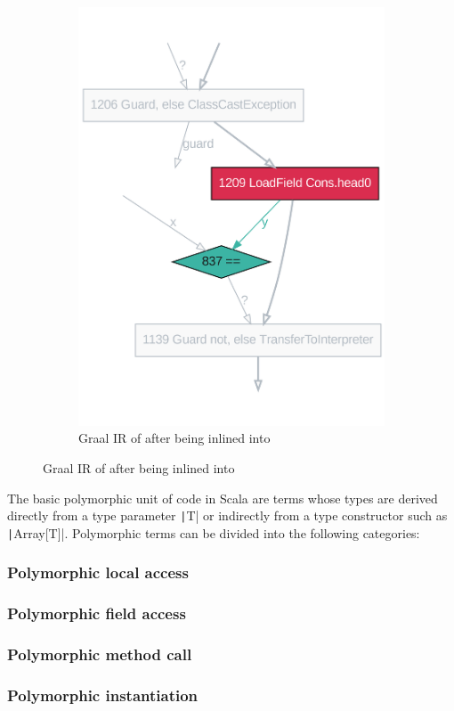 \begin{figure}
\begin{subfigure}[b]{0.4\textwidth}
		\includegraphics[width=\textwidth]{figures/dot/List.contains.specialized.TruffleTier.png}
		\caption{Graal IR of  after being inlined into }
		\label{graalir:cons-contains-head-focus-specialized}
	\end{subfigure}
	\hfill
\end{figure}


The basic polymorphic unit of code in Scala are terms whose types are derived directly from a type parameter \texttt|T| or indirectly from a type constructor such as \texttt|Array[T]|.
Polymorphic terms can be divided into the following categories:

\subsubsection*{Polymorphic local access}
\subsubsection*{Polymorphic field access}
\subsubsection*{Polymorphic method call}
\subsubsection*{Polymorphic instantiation}

